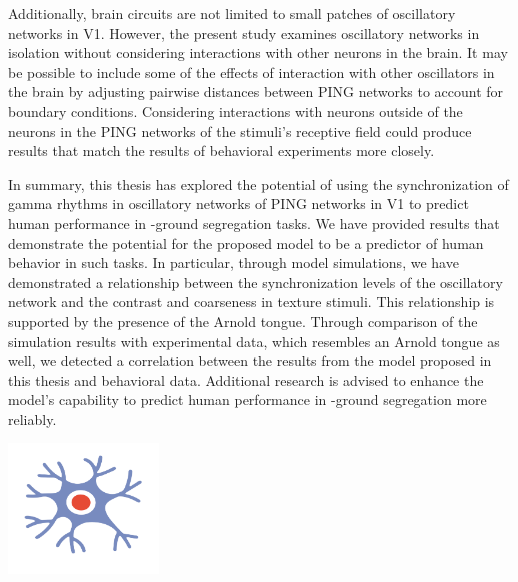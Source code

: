 Additionally, brain circuits are not limited to small patches of oscillatory networks in V1. However, the present study examines oscillatory networks in isolation without considering interactions with other neurons in the brain. It may be possible to include some of the effects of interaction with other oscillators in the brain by adjusting pairwise distances between PING networks to account for boundary conditions. Considering interactions with neurons outside of the neurons in the PING networks of the stimuli's receptive field could produce results that match the results of behavioral experiments more closely.

In summary, this thesis has explored the potential of using the synchronization of gamma rhythms in oscillatory networks of PING networks in V1 to predict human performance in \stimfig-ground segregation tasks. We have provided results that demonstrate the potential for the proposed model to be a predictor of human behavior in such tasks.
In particular, through model simulations, we have demonstrated a relationship between the synchronization levels of the oscillatory network and the contrast and coarseness in texture stimuli. This relationship is supported by the presence of the Arnold tongue. Through comparison of the simulation results with experimental data, which resembles an Arnold tongue as well, we detected a correlation between the results from the model proposed in this thesis and behavioral data. Additional research is advised to enhance the model's capability to predict human performance in \stimfig-ground segregation more reliably.

\vfill
\vfill

\begin{center}
    \includegraphics[width=0.3\textwidth]{src/assets/images/neuron-illustrations/neuron-illustration3.pdf}
\end{center}

\vfill